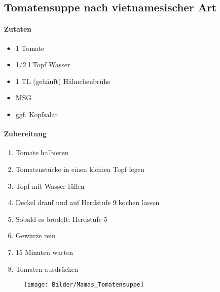 \subsection{Tomatensuppe nach vietnamesischer Art}
\paragraph{Zutaten}
\begin{itemize}[noitemsep]
	\item 1 Tomate
	\item 1/2 l Topf Wasser
	\item 1 TL (gehäuft) Hähnchenbrühe 
	\item MSG
	\item ggf. Kopfsalat
\end{itemize}
\paragraph{Zubereitung}
\begin{enumerate}[noitemsep]
	\item Tomate halbieren
	\item Tomatenstücke in einen kleinen Topf legen
	\item Topf mit Wasser füllen 
	\item Deckel drauf und auf Herdstufe 9 kochen lassen
	\item Sobald es brodelt: Herdstufe 5
	\item Gewürze rein
	\item 15 Minuten warten
	\item Tomaten ausdrücken
\end{enumerate}
\vspace{1.5cm}
\begin{figure}[h]
\centering
\texttt{[image: Bilder/Mamas\_Tomatensuppe]}
\end{figure}